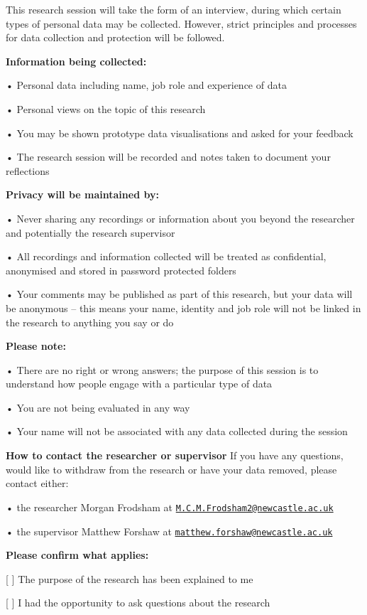 \documentclass[
]{article}
\begin{document}
This research session will take the form of an interview, during which
certain types of personal data may be collected. However, strict
principles and processes for data collection and protection will be
followed.

\textbf{Information being collected:}

• Personal data including name, job role and experience of data

• Personal views on the topic of this research

• You may be shown prototype data visualisations and asked for your
feedback

• The research session will be recorded and notes taken to document your
reflections

\textbf{Privacy will be maintained by:}

• Never sharing any recordings or information about you beyond the
researcher and potentially the research supervisor

• All recordings and information collected will be treated as
confidential, anonymised and stored in password protected folders

• Your comments may be published as part of this research, but your data
will be anonymous -- this means your name, identity and job role will
not be linked in the research to anything you say or do

\textbf{Please note:}

• There are no right or wrong answers; the purpose of this session is to
understand how people engage with a particular type of data

• You are not being evaluated in any way

• Your name will not be associated with any data collected during the
session

\textbf{How to contact the researcher or supervisor} If you have any
questions, would like to withdraw from the research or have your data
removed, please contact either:

• the researcher Morgan Frodsham at
\href{mailto:M.C.M.Frodsham2@newcastle.ac.uk}{\nolinkurl{M.C.M.Frodsham2@newcastle.ac.uk}}

• the supervisor Matthew Forshaw at
\href{mailto:matthew.forshaw@newcastle.ac.uk}{\nolinkurl{matthew.forshaw@newcastle.ac.uk}}

\textbf{Please confirm what applies:}

{[} {]} The purpose of the research has been explained to me

{[} {]} I had the opportunity to ask questions about the research
\end{document}
